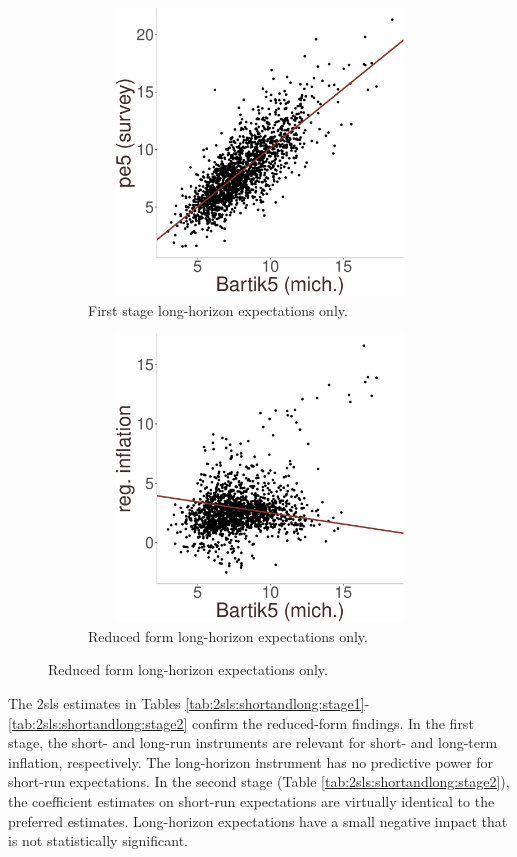 \documentclass[12pt]{article}
\begin{document}
\begin{figure}
\centering
\caption{Long-run inflation expectations: reduced-form estimates.}\label{fig:5year:redform}
\begin{subfigure}[t]{0.75\textwidth}
\centering
\includegraphics[width = 5in, height =3in]{figs/firstStage5only}
\caption{First stage long-horizon expectations only.  }\label{5yearsubfig:shares:group}
\end{subfigure}
\vfill
\begin{subfigure}[t]{0.75\textwidth}
\centering
\includegraphics[width =5in, height =3in]{figs/redform5only}
\caption{Reduced form long-horizon expectations only.}\label{5yearsubfig:shares:cps}
\end{subfigure}
\end{figure}

The 2sls estimates in Tables \ref{tab:2sls:shortandlong:stage1}-\ref{tab:2sls:shortandlong:stage2} confirm the reduced-form findings. In the first stage, the short- and long-run instruments are relevant for short- and long-term inflation, respectively. The long-horizon instrument has no predictive power for short-run expectations. In the second stage (Table \ref{tab:2sls:shortandlong:stage2}), the coefficient estimates on short-run expectations are virtually identical to the preferred estimates. Long-horizon expectations have a small negative impact that is not statistically significant.  
\end{document}
